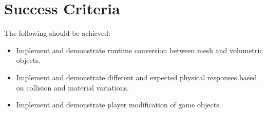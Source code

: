 \begin{comment}
\section*{References}

\begin{description}

\item{[1]} User sp614x. (2011). \emph{Understanding Minecraft Performance.}\\ Available: http://optifog.blogspot.co.uk/2011/08/understanding-minecraft-performance.html. Last accessed 14th Oct 2014.

\item{[2]} \emph{The Algorithmic Beauty of Plants}, P. Prusinkiewicz,
A. Lindenmayer, Springer Verlag 1990 (reprinted 1996).

\item{[3]} \emph{Developmental Models of Herbaceous Plants for
    Computer Imagery Purposes},\break P.~Prusinkiewicz, A. Lindenmayer, J.
  Hanan, \emph{SIGGRAPH~'88 Conference Proceedings}, pp.~141--150.

\item{[4]} \emph{Generative Geometric Design}, J. Heisserman, \emph{IEEE
Computer Graphics \& \break Applications}, March 1994, pp.~37--45.

\end{description}
\end{comment}


\newpage

\section*{Success Criteria}

The following should be achieved:

\begin{itemize}

\item Implement and demonstrate runtime conversion between mesh and volumetric objects.

\item Implement and demonstrate different and expected physical responses based on collision and material variations.

\item Implement and demonstrate player modification of game objects.

\end{itemize}

